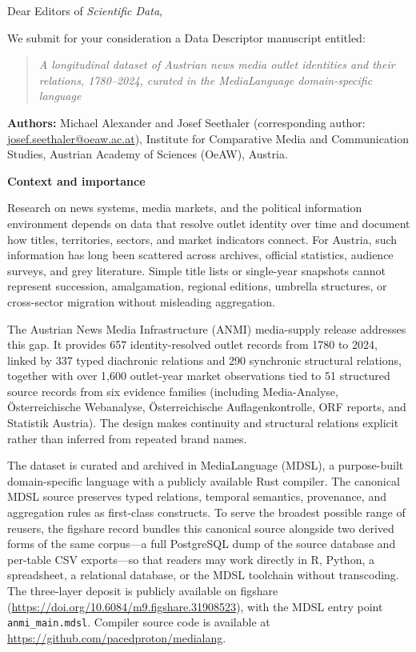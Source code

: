 \documentclass[11pt]{article}
\begin{document}
\noindent Dear Editors of \textit{Scientific Data},

\medskip

We submit for your consideration a Data Descriptor manuscript entitled:

\begin{quote}
\textit{A longitudinal dataset of Austrian news media outlet identities and their relations, 1780--2024, curated in the MediaLanguage domain-specific language}
\end{quote}

\noindent\textbf{Authors:} Michael Alexander and Josef Seethaler (corresponding author: \url{josef.seethaler@oeaw.ac.at}), Institute for Comparative Media and Communication Studies, Austrian Academy of Sciences (OeAW), Austria.

\medskip

\noindent\textbf{Context and importance}

Research on news systems, media markets, and the political information environment depends on data that resolve outlet identity over time and document how titles, territories, sectors, and market indicators connect. For Austria, such information has long been scattered across archives, official statistics, audience surveys, and grey literature. Simple title lists or single-year snapshots cannot represent succession, amalgamation, regional editions, umbrella structures, or cross-sector migration without misleading aggregation.

The Austrian News Media Infrastructure (ANMI) media-supply release addresses this gap. It provides 657 identity-resolved outlet records from 1780 to 2024, linked by 337 typed diachronic relations and 290 synchronic structural relations, together with over 1,600 outlet-year market observations tied to 51 structured source records from six evidence families (including Media-Analyse, \"Osterreichische Webanalyse, \"Osterreichische Auflagenkontrolle, ORF reports, and Statistik Austria). The design makes continuity and structural relations explicit rather than inferred from repeated brand names.

The dataset is curated and archived in MediaLanguage (MDSL), a purpose-built domain-specific language with a publicly available Rust compiler. The canonical MDSL source preserves typed relations, temporal semantics, provenance, and aggregation rules as first-class constructs. To serve the broadest possible range of reusers, the figshare record bundles this canonical source alongside two derived forms of the same corpus---a full PostgreSQL dump of the source database and per-table CSV exports---so that readers may work directly in R, Python, a spreadsheet, a relational database, or the MDSL toolchain without transcoding. The three-layer deposit is publicly available on figshare (\url{https://doi.org/10.6084/m9.figshare.31908523}), with the MDSL entry point \texttt{anmi\_main.mdsl}. Compiler source code is available at \url{https://github.com/pacedproton/medialang}.
\end{document}
